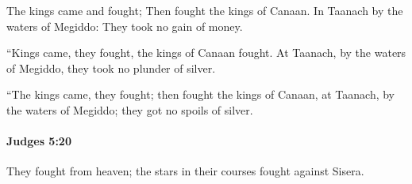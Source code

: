 			\begin{versebox}
					\item[BHS] 
					\item[ASV] The kings came and fought; Then fought the kings of Canaan. In Taanach by the waters of Megiddo: They took no gain of money.
					\item[NIV] “Kings came, they fought, the kings of Canaan fought. At Taanach, by the waters of Megiddo, they took no plunder of silver.
					\item[NRSV] “The kings came, they fought; then fought the kings of Canaan, at Taanach, by the waters of Megiddo; they got no spoils of silver.
			\end{versebox}

		\paragraph{Judges 5:20} %
			\label{JUDGES-5-20}

			They fought from heaven; the stars in their courses fought against Sisera.

